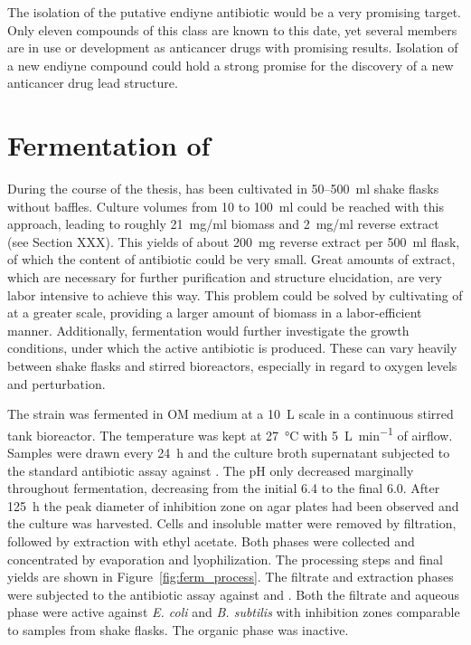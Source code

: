 The isolation of the putative endiyne antibiotic would be a very promising target.
Only eleven compounds of this class are known to this date, yet several members are in use or development as anticancer drugs with promising results.\autocite{Liang2010,Galm2005}
Isolation of a new endiyne compound could  hold a strong promise for the discovery of a new anticancer drug lead structure.



\section{Fermentation of \tue{}} %
\label{sec:fermentation_of_tue}

During the course of the thesis, \tue{} has been cultivated in 50--500~ml shake flasks without baffles.
Culture volumes from 10 to 100~ml could be reached with this approach, leading to roughly 21~mg/ml biomass and 2~mg/ml reverse extract (see Section XXX).
This yields of about 200~mg reverse extract per 500~ml flask, of which the content of antibiotic could be very small.
Great amounts of extract, which are necessary for further purification and structure elucidation, are very labor intensive to achieve this way.
This problem could be solved by cultivating of \tue{} at a greater scale, providing a larger amount of biomass in a labor-efficient manner.
Additionally, fermentation would further investigate the growth conditions, under which the active antibiotic is produced.
These can vary heavily between shake flasks and stirred bioreactors, especially in regard to oxygen levels and perturbation.\autocite{Buchs2001}

The strain was fermented in OM medium at a \SI{10}{\liter} scale in a continuous stirred tank bioreactor.
The temperature was kept at \SI{27}{\celsius} with \SI{5}{\liter\per\minute} of airflow.
Samples were drawn every \SI{24}{\hour} and the culture broth supernatant subjected to the standard antibiotic assay against \coli{}.
The pH only decreased marginally throughout fermentation, decreasing from the initial 6.4 to the final 6.0.
After \SI{125}{\hour} the peak diameter of inhibition zone on agar plates had been observed and the culture was harvested.
Cells and insoluble matter were removed by filtration, followed by extraction with ethyl acetate.
Both phases were collected and concentrated by evaporation and lyophilization.
The processing steps and final yields are shown in Figure~\ref{fig:ferm_process}.
The filtrate and extraction phases were subjected to the antibiotic assay against \coli{} and \bac{}.
Both the filtrate and aqueous phase were active against \emph{E. coli} and \emph{B. subtilis} with inhibition zones comparable to samples from shake flasks.
The organic phase was inactive.


